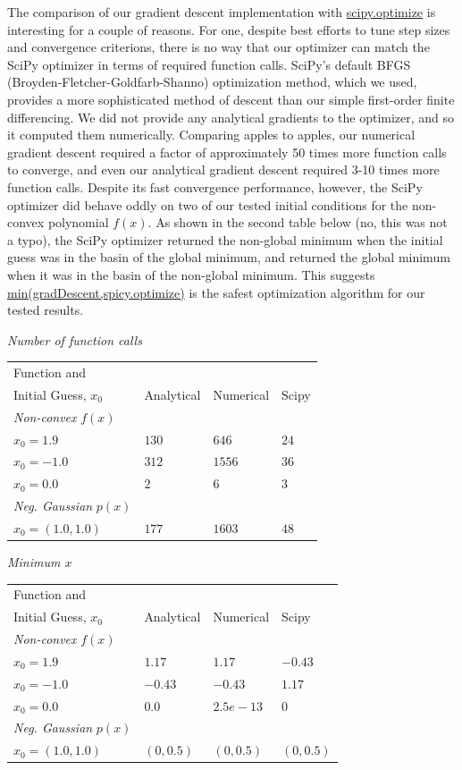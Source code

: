 \documentclass{article}
\begin{document}
The comparison of our gradient descent implementation with \url{scipy.optimize} is interesting for a couple of reasons.  For one, despite best efforts to tune step sizes and convergence criterions, there is no way that our optimizer can match the SciPy optimizer in terms of required function calls.  SciPy's default BFGS (Broyden-Fletcher-Goldfarb-Shanno) optimization method, which we used, provides a more sophisticated method of descent than our simple first-order finite differencing.  We did not provide any analytical gradients to the optimizer, and so it computed them numerically.  Comparing apples to apples, our numerical gradient descent required a factor of approximately 50 times more function calls to converge, and even our analytical gradient descent required 3-10 times more function calls.  Despite its fast convergence performance, however, the SciPy optimizer did behave oddly on two of our tested initial conditions for the non-convex polynomial $f(x)$.  As shown in the second table below (no, this was not a typo), the SciPy optimizer returned the non-global minimum when the initial guess was in the basin of the global minimum, and returned the global minimum when it was in the basin of the non-global minimum.  This suggests \url{min(gradDescent,spicy.optimize)} is the safest optimization algorithm for our tested results.





\textit{Number of function calls}

\begin{tabular}{|l|l|l|l|}
\hline
Function and & & &\\ Initial Guess, $x_0$ & Analytical & Numerical & Scipy \\ \hline
\textit{Non-convex} $f(x)$ & & &\\ \hline
$x_0 = 1.9$ & $130$ & $646$ & $24$\\\hline
$x_0 = -1.0$ & $312$ & $1556$ & $36$ \\ \hline
$x_0 = 0.0$ & $2$ & $6$ & $3$\\ \hline
\textit{Neg. Gaussian} $p(x)$ & & & \\ \hline
$x_0 = (1.0,1.0)$ & $177$ & $1603$ & $48$ \\ \hline
\end{tabular}

\textit{Minimum $x$}

\begin{tabular}{|l|l|l|l|}
\hline
Function and & & &\\ Initial Guess, $x_0$ & Analytical & Numerical & Scipy \\ \hline
\textit{Non-convex} $f(x)$ & & &\\ \hline
$x_0 = 1.9$ & $1.17$ & $1.17$ & $-0.43$\\\hline
$x_0 = -1.0$ & $-0.43$ & $-0.43$ & $1.17$ \\ \hline
$x_0 = 0.0$ & $0.0$ & $2.5e-13$ & $0$\\ \hline
\textit{Neg. Gaussian} $p(x)$ & & & \\ \hline
$x_0 = (1.0,1.0)$ & $(0,0.5)$ & $(0,0.5)$ & $(0,0.5)$ \\ \hline
\end{tabular}
\end{document}
